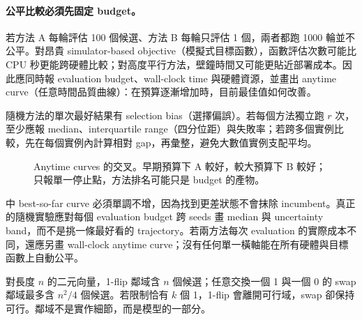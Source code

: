 \documentclass[11pt,a4paper,oneside,openany]{book}
\begin{document}
\paragraph{公平比較必須先固定 budget。}
若方法 A 每輪評估 100 個候選、方法 B 每輪只評估 1 個，兩者都跑 1000 輪並不公平。對昂貴 simulator-based objective（模擬式目標函數），函數評估次數可能比 CPU 秒更能跨硬體比較；對高度平行方法，壁鐘時間又可能更貼近部署成本。因此應同時報 evaluation budget、wall-clock time 與硬體資源，並畫出 anytime curve（任意時間品質曲線）：在預算逐漸增加時，目前最佳值如何改善。

隨機方法的單次最好結果有 selection bias（選擇偏誤）。若每個方法獨立跑 $r$ 次，至少應報 median、interquartile range（四分位距）與失敗率；若跨多個實例比較，先在每個實例內計算相對 gap，再彙整，避免大數值實例支配平均。

\begin{figure}[htbp]
\centering
{}
\caption{Anytime curves 的交叉。早期預算下 A 較好，較大預算下 B 較好；只報單一停止點，方法排名可能只是 budget 的產物。}
\label{fig:anytime-crossing}
\end{figure}

 中 best-so-far curve 必須單調不增，因為找到更差狀態不會抹除 incumbent。真正的隨機實驗應對每個 evaluation budget 跨 seeds 畫 median 與 uncertainty band，而不是挑一條最好看的 trajectory。若兩方法每次 evaluation 的實際成本不同，還應另畫 wall-clock anytime curve；沒有任何單一橫軸能在所有硬體與目標函數上自動公平。

\begin{example}[兩種鄰域]
對長度 $n$ 的二元向量，1-flip 鄰域含 $n$ 個候選；任意交換一個 1 與一個 0 的 swap 鄰域最多含 $n^2/4$ 個候選。若限制恰有 $k$ 個 1，1-flip 會離開可行域，swap 卻保持可行。鄰域不是實作細節，而是模型的一部分。
\end{example}
\end{document}
